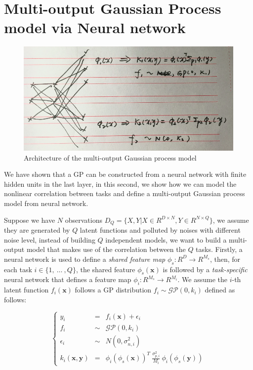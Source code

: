 \section{Multi-output Gaussian Process model via Neural network}

\begin{figure}[!htb]
    \centering
    \includegraphics[width=\columnwidth]{./img/NN-MOGP.png}
    \caption{Architecture of the multi-output Gaussian process model}
    \label{fig:MONNGP}
\end{figure}

We have shown that a GP can be constructed from a neural network with finite hidden units in the last layer, in this second, we show how we can model the nonlinear correlation between tasks and define a multi-output Gaussian process model from neural network. 

Suppose we have $N$ observations $D_Q = \{X, Y | X \in R^{D \times N}, Y \in R^{N \times Q}\}$, we assume they are generated by $Q$ latent functions and polluted by noises with different noise level, instead of building $Q$ independent models, we want to build a multi-output model that makes use of the correlation between the $Q$ tasks. Firstly, a neural network is used to define a \emph{shared feature map} $\phi_s : R^D \rightarrow R^{M_s}$, then, for each task $i \in \{1,~\dots~,Q\}$, the shared feature $\phi_s(\bm{x})$ is followed by a \emph{task-specific} neural network that defines a feature map $\phi_i : R^{M_s} \rightarrow R^{M_i}$. We assume the $i$-th latent function $f_i(\bm{x})$ follows a GP distribution $f_i \sim \mathcal{GP}(0, k_i)$ defined as follows:

\begin{equation}
    \label{eq:mo_kernel}
    \left\{
    \begin{array}{lll}
        y_i                 &=&    f_i(\bm{x}) + \epsilon_i  \\
        f_i                 &\sim& \mathcal{GP}(0, k_i)      \\
        \epsilon_i          &\sim& N(0, \sigma_{n, i}^2)     \\
        k_i(\bm{x}, \bm{y}) &=&    \phi_i(\phi_s(\bm{x}))^T~\frac{\sigma_{p, i}^2}{M_i}~\phi_i(\phi_s(\bm{y}))
    \end{array}
    \right.
\end{equation}

